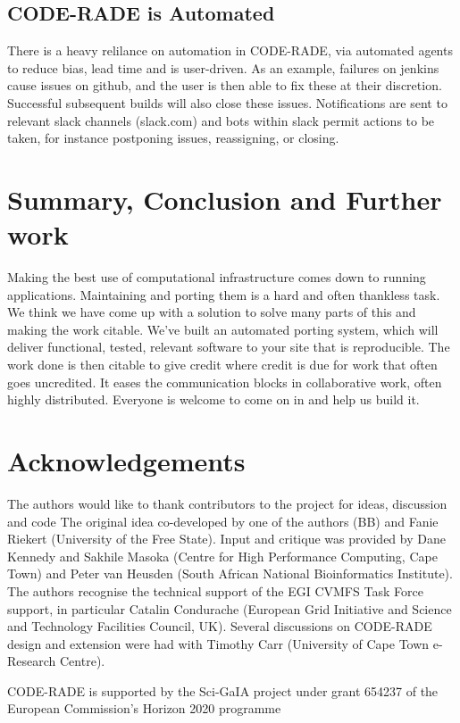 \documentclass[a4paper]{jpconf}
\begin{document}
\subsection{CODE-RADE is Automated}

There is a heavy relilance on automation in CODE-RADE, via automated agents to reduce bias, lead time
and is user-driven.
As an example, failures on jenkins cause issues on github, and the user is then able to fix these at
their discretion.
Successful subsequent builds will also close these issues.
Notifications are sent to relevant slack channels (slack.com) and bots within slack permit actions
to be taken, for instance postponing issues, reassigning, or closing.

\section{Summary, Conclusion and Further work}

Making the best use of computational infrastructure comes down to running applications.
Maintaining and porting them is a hard and often thankless task.
We think we have come up with a solution to solve many parts of this and making the work citable.
We've built an automated porting system, which will deliver functional, tested, relevant software to
your site that is reproducible. The work done is then citable to give credit where credit is due for work
that often goes uncredited.
It eases the communication blocks in collaborative work, often highly distributed.
Everyone is welcome to come on in and help us build it.

\section*{Acknowledgements}
The authors would like to thank contributors to the project for ideas, discussion and code
The original idea co-developed by one of the authors (BB) and Fanie Riekert (University of the Free
State). Input and critique was provided  by Dane Kennedy and Sakhile Masoka (Centre for High
Performance Computing, Cape Town) and Peter van Heusden (South African National Bioinformatics
Institute). The authors recognise the technical support of the EGI CVMFS Task Force support, in
particular Catalin Condurache (European Grid Initiative and Science and Technology Facilities
Council, UK). Several discussions on CODE-RADE design and extension were had with Timothy Carr
(University of Cape Town e-Research Centre).

CODE-RADE is supported by the Sci-GaIA project under grant 654237 of the European Commission's
Horizon 2020 programme
\end{document}
